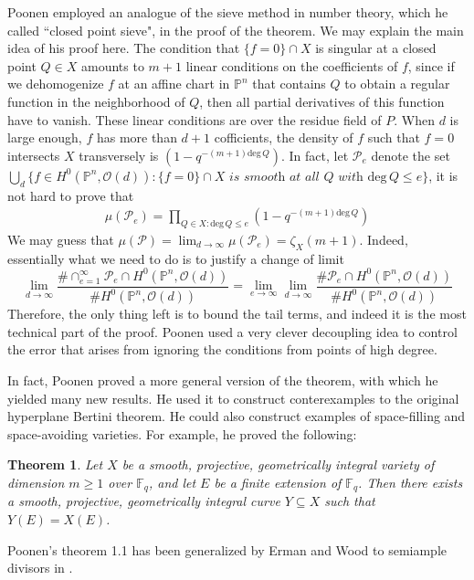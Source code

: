 \documentclass[12pt]{article}
\theoremstyle{plain}
\newtheorem{theorem}[equation]{Theorem}
\theoremstyle{definition}
\newcommand{\IF}{\mathbb{F}}
\newcommand{\IP}{\mathbb{P}}
\newcommand{\sO}{\mathcal{O}}
\newcommand{\sP}{\mathcal{P}}
\renewcommand{\deg}{\mathrm{deg}\,}
\newcommand\union{\bigcup}
\newcommand{\<}{\langle}
\renewcommand{\>}{\rangle}
\begin{document}
Poonen employed an analogue of the sieve method in number theory, which he called ``closed point sieve", in the proof of the theorem. We may explain the main idea of his proof here. The condition that $\{ f = 0 \} \cap X$ is singular at a closed point $Q \in X$ amounts to $m + 1$ linear conditions on the coefficients of $f$, since if we dehomogenize $f$ at an affine chart in $\IP^n$ that contains $Q$ to obtain a regular function in the neighborhood of $Q$, then all partial derivatives of this function have to vanish. These linear conditions are over the residue field of $P$. When $d$ is large enough, $f$ has more than $d + 1$ cofficients, the density of $f$ such that $f = 0$ intersects $X$ transversely is $(1 - q^{-(m + 1) \deg Q})$. In fact, let $\sP_{e}$ denote the set $\union_d \{ f \in H^0(\IP^n, \sO(d)) : \{f=0\} \cap X \textit{ is smooth at all }Q \textit{ with } \deg Q \le e \}$, it is not hard to prove that 
\begin{align*}
\mu(\sP_e) = \prod_{Q \in X : \deg Q \le e} (1 - q^{-(m + 1) \deg Q})
\end{align*}  
We may guess that $\mu(\sP) = \lim_{d \to \infty} \mu(\sP_e) = \zeta_X(m + 1)$. Indeed, essentially what we need to do is to justify a change of limit
$$ \lim_{d \to \infty} \frac{\# \cap_{e = 1}^\infty \sP_e \cap H^0(\IP^n, \sO(d))}{\# H^0(\IP^n, \sO(d))} = \lim_{e \to \infty} \lim_{d \to \infty} \frac{\# \sP_e \cap H^0(\IP^n, \sO(d))}{\# H^0(\IP^n, \sO(d))}$$
Therefore, the only thing left is to bound the tail terms, and indeed it is the most technical part of the proof. Poonen used a very clever decoupling idea to control the error that arises from ignoring the conditions from points of high degree. 


In fact, Poonen proved a more general version of the theorem, with which he yielded many new results. He used it to construct conterexamples to the original hyperplane Bertini theorem. He could also construct examples of space-filling and space-avoiding varieties. For example, he proved the following:

\begin{theorem}
Let $X$ be a smooth, projective, geometrically integral variety of dimension $m \ge 1$ over $\IF_q$, and let $E$ be a finite extension of $\IF_q$. Then there exists
a smooth, projective, geometrically integral curve $Y \subseteq X$ such that $Y(E) = X(E)$.
\end{theorem}

Poonen's theorem 1.1 has been generalized by Erman and Wood to semiample divisors in \cite{Wood}.  
\end{document}
